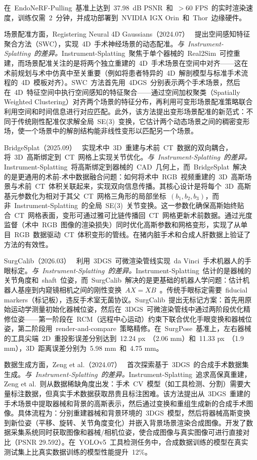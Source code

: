 在~EndoNeRF-Pulling~基准上达到~37.98~dB PSNR~和~$>$60 FPS~的实时渲染速度，训练仅需~2~分钟，并成功部署到~NVIDIA IGX Orin~和~Thor~边缘硬件。

场景配准方面，Registering Neural 4D Gaussians（2024.07）~\cite{2407_20213} 提出空间感知特征聚合方法（SWC），实现~4D~手术神经场景的动态配准。\textit{与~Instrument-Splatting~的差异。}Instrument-Splatting~聚焦于单个器械的~Real2Sim~可控重建，而场景配准关注的是将两个独立重建的~4D~手术场景在空间中对齐——这在术前规划与术中仿真中至关重要（例如将患者特异的~4D~解剖模型与标准手术流程的~4D~模板对齐）。SWC~方法首先用~4DGS~分别表示两个手术场景，然后在~4D~特征空间中执行空间感知的特征聚合——通过空间加权聚类（Spatially Weighted Clustering）对齐两个场景的特征分布，再利用可变形场景配准策略联合利用空间和时间信息进行对应匹配。此外，该方法提出变形场景配准的新范式：不同于传统刚性配准仅求解全局~SE(3)~变换，它估计两个动态场景之间的稠密变形场，使一个场景中的解剖结构能非线性变形以匹配另一个场景。

BridgeSplat（2025.09）~\cite{2509_18501} 实现术中~3D~重建与术前~CT~数据的双向耦合，将~3D~高斯绑定到~CT~网格上实现关节优化。\textit{与~Instrument-Splatting~的差异。}Instrument-Splatting~将高斯绑定到器械的~CAD~几何上，而~BridgeSplat~解决的是更通用的术前-术中数据融合问题：如何将术中~RGB~视频重建的~3D~高斯场景与术前~CT~体积关联起来，实现双向信息传播。其核心设计是将每个~3D~高斯基元参数化为相对于其父~CT~网格三角形的局部坐标~$(b_1, b_2, b_3)$，而非~Instrument-Splatting~的全局~SE(3)~关节变换。这一参数化确保高斯始终贴合~CT~网格表面，变形可通过雅可比链传播回~CT~网格更新术前数据。通过光度监督（术中~RGB~图像的渲染损失）同时优化高斯参数和网格变形，实现了从单目~RGB~数据驱动~CT~体积变形的管线。在猪内脏手术和合成人肝数据上验证了方法的有效性。

SurgCalib（2026.03）~\cite{2603_08983} 利用~3DGS~可微渲染管线实现~da Vinci~手术机器人的手眼标定。\textit{与~Instrument-Splatting~的差异。}Instrument-Splatting~估计的是器械的关节角度和~shaft~位姿，而~SurgCalib~解决的是更基础的机器人学问题：估计机器人基座到内窥镜相机之间的刚性变换~$AX = XB$~。传统手眼标定需要~fiducial markers（标记板），违反手术室无菌协议。SurgCalib~提出无标记方案：首先用原始运动学测量初始化器械位姿，然后在~3DGS~可微渲染管线中通过两阶段优化精修位姿——第一阶段在~RCM（远程中心运动）约束下联合优化手眼变换和器械位姿，第二阶段用~render-and-compare~策略精修。在~SurgPose~基准上，左右器械的工具尖端~2D~重投影误差分别达到~12.24 px~（2.06 mm）和~11.33 px~（1.9 mm），3D~距离误差分别为~5.98 mm~和~4.75 mm。

数据生成方面，Zeng et al.（2024.07）~\cite{2407_14846} 首次探索基于~3DGS~的合成手术数据集生成。\textit{与~Instrument-Splatting~的差异。}Instrument-Splatting~追求高保真重建，Zeng et al.~则从数据稀缺角度出发：手术~CV~模型（如工具检测、分割）需要大量标注数据，但真实手术数据获取昂贵且标注困难。该方法提出从~3DGS~重建的手术场景中提取器械和背景的高斯表示，然后通过变换和重组生成新的合成手术图像。具体流程为：分别重建器械和背景环境的~3DGS~模型，然后将器械高斯变换到新位姿（平移、旋转、关节角度变化）并嵌入背景场景渲染合成图像。开发了数据采集系统同时获取图像和器械/相机位姿，使合成图像与真实图像可进行直接对比（PSNR 29.592）。在~YOLOv5~工具检测任务中，合成数据训练的模型在真实测试集上比真实数据训练的模型性能提升~12\%。

